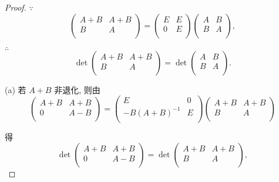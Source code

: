 \documentclass{ctexart}
\begin{document}
\begin{proof}
    $\because$
    \[\begin{pmatrix}
        A+B & A+B \\
        B & A \\
    \end{pmatrix}=\begin{pmatrix}
        E & E \\
        0 & E \\
    \end{pmatrix}\begin{pmatrix}
        A & B \\
        B & A \\
    \end{pmatrix},\]

    $\therefore$
    \[\det\begin{pmatrix}
        A+B & A+B \\
        B & A \\
    \end{pmatrix}=\det\begin{pmatrix}
        A & B \\
        B & A \\
    \end{pmatrix}.\]

    (a) 若 $A+B$ 非退化, 则由
    \[\begin{pmatrix}
        A+B & A+B \\
        0 & A-B \\
    \end{pmatrix}=\begin{pmatrix}
        E & 0 \\
        -B(A+B)^{-1} & E \\
    \end{pmatrix}\begin{pmatrix}
        A+B & A+B \\
        B & A \\
    \end{pmatrix}\]

    得
    \[\det\begin{pmatrix}
        A+B & A+B \\
        0 & A-B \\
    \end{pmatrix}=\det\begin{pmatrix}
        A+B & A+B \\
        B & A \\
    \end{pmatrix},\]


\end{proof}
\end{document}
